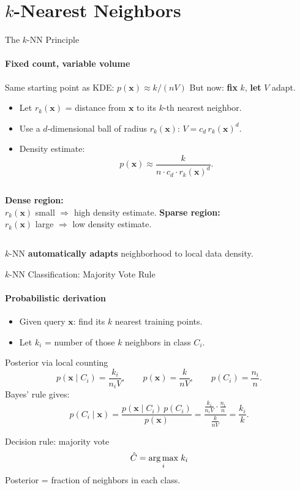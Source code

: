 \section{$k$-Nearest Neighbors}

\begin{frame}{The $k$-NN Principle}
  \framesubtitle{Fixed count, variable volume}
  \begin{block}{Same starting point as KDE: $p(\mathbf{x})\approx k/(nV)$}
    But now: \textbf{fix} $k$, \textbf{let} $V$ adapt.
  \end{block}
  \begin{itemize}
    \item Let $r_k(\mathbf{x})$ = distance from $\mathbf{x}$ to its $k$-th nearest neighbor.
    \item Use a $d$-dimensional ball of radius $r_k(\mathbf{x})$: $V = c_d\,r_k(\mathbf{x})^d$.
    \item Density estimate:
    \[
      p(\mathbf{x}) \approx \frac{k}{n\cdot c_d\cdot r_k(\mathbf{x})^d}.
    \]
  \end{itemize}
  \begin{columns}[T]
      \textbf{Dense region:}\\
      $r_k(\mathbf{x})$ small $\Rightarrow$ high density estimate.
      \textbf{Sparse region:}\\
      $r_k(\mathbf{x})$ large $\Rightarrow$ low density estimate.
  \end{columns}
  \medskip
  \begin{alertblock}{}
    $k$-NN \textbf{automatically adapts} neighborhood to local data density.
  \end{alertblock}
\end{frame}

\begin{frame}{$k$-NN Classification: Majority Vote Rule}
  \framesubtitle{Probabilistic derivation}
  \begin{itemize}
    \item Given query $\mathbf{x}$: find its $k$ nearest training points.
    \item Let $k_i$ = number of those $k$ neighbors in class $C_i$.
  \end{itemize}
  \begin{block}{Posterior via local counting}
    \[
      p(\mathbf{x}\mid C_i)=\frac{k_i}{n_i V},\qquad
      p(\mathbf{x})=\frac{k}{nV},\qquad
      p(C_i)=\frac{n_i}{n}.
    \]
    Bayes' rule gives:
    \[
      p(C_i\mid\mathbf{x})
      = \frac{p(\mathbf{x}\mid C_i)\,p(C_i)}{p(\mathbf{x})}
      = \frac{\tfrac{k_i}{n_i V}\cdot\tfrac{n_i}{n}}{\tfrac{k}{nV}}
      = \frac{k_i}{k}.
    \]
  \end{block}
  \begin{alertblock}{Decision rule: majority vote}
    \[
      \hat{C} = \underset{i}{\operatorname{arg\,max}}\; k_i
    \]
    Posterior = fraction of neighbors in each class.
  \end{alertblock}
\end{frame}

